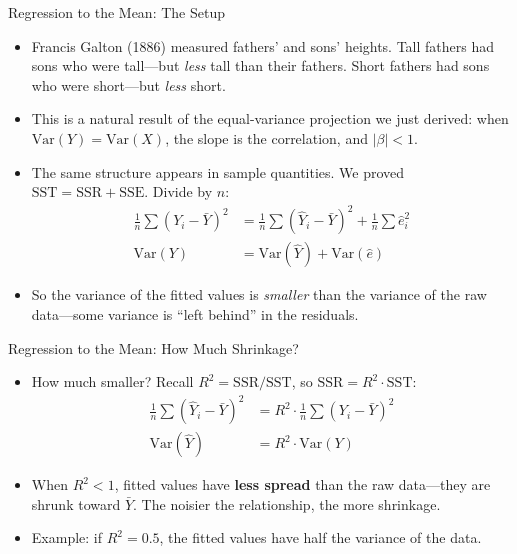 \documentclass[aspectratio=169, handout]{beamer}
\numberwithin{equation}{section}
\begin{document}
\begin{frame}{Regression to the Mean: The Setup}
\begin{itemize}
\item Francis Galton (1886) measured fathers' and sons' heights. Tall fathers had sons who were tall---but \emph{less} tall than their fathers. Short fathers had sons who were short---but \emph{less} short.\pause
\item This is a natural result of the equal-variance projection we just derived: when $\text{Var}(Y) = \text{Var}(X)$, the slope is the correlation, and $|\beta| < 1$.\pause
\item The same structure appears in sample quantities. We proved $\text{SST}=\text{SSR}+\text{SSE}$. Divide by $n$:
\begin{align*}
\frac{1}{n}\sum(Y_i-\bar{Y})^2 &= \frac{1}{n}\sum(\hat{Y}_i-\bar{Y})^2 + \frac{1}{n}\sum\hat{e}_i^2\\[4pt]
\text{Var}(Y) &= \text{Var}(\hat{Y}) + \text{Var}(\hat{e})
\end{align*}\pause
\item So the variance of the fitted values is \emph{smaller} than the variance of the raw data---some variance is ``left behind'' in the residuals.
\end{itemize}
\end{frame}

\begin{frame}{Regression to the Mean: How Much Shrinkage?}
\begin{itemize}
\item How much smaller? Recall $R^2 = \text{SSR}/\text{SST}$, so $\text{SSR} = R^2 \cdot \text{SST}$:
\vspace{-0.3em}
\begin{align*}
\frac{1}{n}\sum(\hat{Y}_i - \bar{Y})^2 &= R^2 \cdot \frac{1}{n}\sum(Y_i - \bar{Y})^2 \tag{divide both sides by $n$}\\[4pt]
\text{Var}(\hat{Y}) &= R^2 \cdot \text{Var}(Y)
\end{align*}
\vspace{-0.5em}\pause
\item When $R^2<1$, fitted values have \textbf{less spread} than the raw data---they are shrunk toward $\bar{Y}$. The noisier the relationship, the more shrinkage.\pause
\item Example: if $R^2=0.5$, the fitted values have half the variance of the data.
\end{itemize}
\end{frame}
\end{document}
